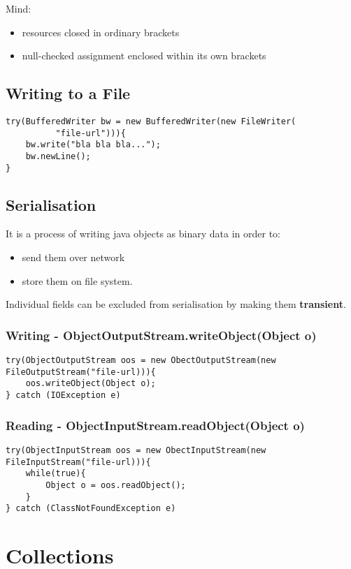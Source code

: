\documentclass{report}
\begin{document}
Mind:
\begin{itemize}
	\item resources closed in ordinary brackets
	\item null-checked assignment enclosed within its own brackets
\end{itemize}

\chapter{Writing to a File}

\begin{verbatim}
try(BufferedWriter bw = new BufferedWriter(new FileWriter(
          "file-url"))){
	bw.write("bla bla bla...");
	bw.newLine();
}
\end{verbatim}

\chapter{Serialisation}
It is a process of writing java objects as binary data in order to:
\begin{itemize}
	\item send them over network
	\item store them on file system.
\end{itemize}
Individual fields can be excluded from serialisation by making them \textbf{transient}.

\section{Writing - ObjectOutputStream.writeObject(Object o)}
\begin{verbatim}
try(ObjectOutputStream oos = new ObectOutputStream(new FileOutputStream("file-url))){
	oos.writeObject(Object o);
} catch (IOException e)
\end{verbatim}

\section{Reading - ObjectInputStream.readObject(Object o)}
\begin{verbatim}
try(ObjectInputStream oos = new ObectInputStream(new FileInputStream("file-url))){
	while(true){
		Object o = oos.readObject();
	}
} catch (ClassNotFoundException e)
\end{verbatim}




\part{Collections}
\end{document}
